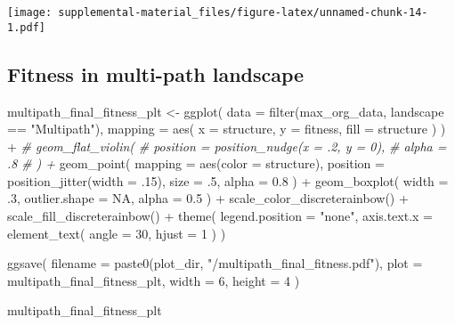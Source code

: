 \documentclass[
]{book}
\newenvironment{Shaded}{\begin{snugshade}}{\end{snugshade}}
\newcommand{\AttributeTok}[1]{\textcolor[rgb]{0.77,0.63,0.00}{#1}}
\newcommand{\CommentTok}[1]{\textcolor[rgb]{0.56,0.35,0.01}{\textit{#1}}}
\newcommand{\ConstantTok}[1]{\textcolor[rgb]{0.00,0.00,0.00}{#1}}
\newcommand{\DecValTok}[1]{\textcolor[rgb]{0.00,0.00,0.81}{#1}}
\newcommand{\FloatTok}[1]{\textcolor[rgb]{0.00,0.00,0.81}{#1}}
\newcommand{\FunctionTok}[1]{\textcolor[rgb]{0.00,0.00,0.00}{#1}}
\newcommand{\NormalTok}[1]{#1}
\newcommand{\OtherTok}[1]{\textcolor[rgb]{0.56,0.35,0.01}{#1}}
\newcommand{\SpecialCharTok}[1]{\textcolor[rgb]{0.00,0.00,0.00}{#1}}
\newcommand{\StringTok}[1]{\textcolor[rgb]{0.31,0.60,0.02}{#1}}
\begin{document}
\texttt{[image: supplemental-material\_files/figure-latex/unnamed-chunk-14-1.pdf]}

\hypertarget{fitness-in-multi-path-landscape}{%
\subsection{Fitness in multi-path landscape}\label{fitness-in-multi-path-landscape}}

\begin{Shaded}
\begin{Highlighting}[]
\NormalTok{multipath\_final\_fitness\_plt }\OtherTok{\textless{}{-}} \FunctionTok{ggplot}\NormalTok{(}
    \AttributeTok{data =} \FunctionTok{filter}\NormalTok{(max\_org\_data, landscape }\SpecialCharTok{==} \StringTok{"Multipath"}\NormalTok{),}
    \AttributeTok{mapping =} \FunctionTok{aes}\NormalTok{(}
      \AttributeTok{x =}\NormalTok{ structure,}
      \AttributeTok{y =}\NormalTok{ fitness,}
      \AttributeTok{fill =}\NormalTok{ structure}
\NormalTok{    )}
\NormalTok{  ) }\SpecialCharTok{+}
  \CommentTok{\# geom\_flat\_violin(}
  \CommentTok{\#   position = position\_nudge(x = .2, y = 0),}
  \CommentTok{\#   alpha = .8}
  \CommentTok{\# ) +}
  \FunctionTok{geom\_point}\NormalTok{(}
    \AttributeTok{mapping =} \FunctionTok{aes}\NormalTok{(}\AttributeTok{color =}\NormalTok{ structure),}
    \AttributeTok{position =} \FunctionTok{position\_jitter}\NormalTok{(}\AttributeTok{width =}\NormalTok{ .}\DecValTok{15}\NormalTok{),}
    \AttributeTok{size =}\NormalTok{ .}\DecValTok{5}\NormalTok{,}
    \AttributeTok{alpha =} \FloatTok{0.8}
\NormalTok{  ) }\SpecialCharTok{+}
  \FunctionTok{geom\_boxplot}\NormalTok{(}
    \AttributeTok{width =}\NormalTok{ .}\DecValTok{3}\NormalTok{,}
    \AttributeTok{outlier.shape =} \ConstantTok{NA}\NormalTok{,}
    \AttributeTok{alpha =} \FloatTok{0.5}
\NormalTok{  ) }\SpecialCharTok{+}
  \FunctionTok{scale\_color\_discreterainbow}\NormalTok{() }\SpecialCharTok{+}
  \FunctionTok{scale\_fill\_discreterainbow}\NormalTok{() }\SpecialCharTok{+}
  \FunctionTok{theme}\NormalTok{(}
    \AttributeTok{legend.position =} \StringTok{"none"}\NormalTok{,}
    \AttributeTok{axis.text.x =} \FunctionTok{element\_text}\NormalTok{(}
      \AttributeTok{angle =} \DecValTok{30}\NormalTok{,}
      \AttributeTok{hjust =} \DecValTok{1}
\NormalTok{    )}
\NormalTok{  )}

\FunctionTok{ggsave}\NormalTok{(}
  \AttributeTok{filename =} \FunctionTok{paste0}\NormalTok{(plot\_dir, }\StringTok{"/multipath\_final\_fitness.pdf"}\NormalTok{),}
  \AttributeTok{plot =}\NormalTok{ multipath\_final\_fitness\_plt,}
  \AttributeTok{width =} \DecValTok{6}\NormalTok{,}
  \AttributeTok{height =} \DecValTok{4}
\NormalTok{)}

\NormalTok{multipath\_final\_fitness\_plt}
\end{Highlighting}
\end{Shaded}
\end{document}
